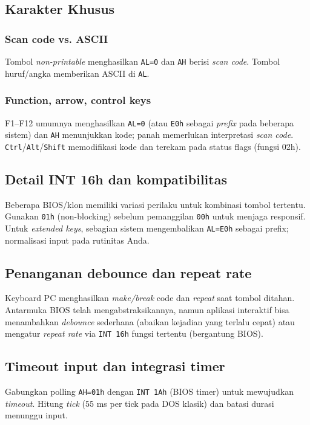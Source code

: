\subsection{Karakter Khusus}
\subsubsection{Scan code vs. ASCII}
Tombol \textit{non-printable} menghasilkan \texttt{AL=0} dan \texttt{AH} berisi \textit{scan code}. Tombol huruf/angka memberikan ASCII di \texttt{AL}.

\subsubsection{Function, arrow, control keys}
F1--F12 umumnya menghasilkan \texttt{AL=0} (atau \texttt{E0h} sebagai \textit{prefix} pada beberapa sistem) dan \texttt{AH} menunjukkan kode; panah memerlukan interpretasi \textit{scan code}. \texttt{Ctrl}/\texttt{Alt}/\texttt{Shift} memodifikasi kode dan terekam pada status flags (fungsi 02h).

\subsection{Detail INT 16h dan kompatibilitas}
Beberapa BIOS/klon memiliki variasi perilaku untuk kombinasi tombol tertentu. Gunakan \texttt{01h} (non-blocking) sebelum pemanggilan \texttt{00h} untuk menjaga responsif. Untuk \textit{extended keys}, sebagian sistem mengembalikan \texttt{AL=E0h} sebagai prefix; normalisasi input pada rutinitas Anda. \cite{rbil}

\subsection{Penanganan debounce dan repeat rate}
Keyboard PC menghasilkan \textit{make/break} code dan \textit{repeat} saat tombol ditahan. Antarmuka BIOS telah mengabstraksikannya, namun aplikasi interaktif bisa menambahkan \textit{debounce} sederhana (abaikan kejadian yang terlalu cepat) atau mengatur \textit{repeat rate} via \texttt{INT 16h} fungsi tertentu (bergantung BIOS). \cite{osdev_wiki}

\subsection{Timeout input dan integrasi timer}
Gabungkan polling \texttt{AH=01h} dengan \texttt{INT 1Ah} (BIOS timer) untuk mewujudkan \textit{timeout}. Hitung \textit{tick} (55 ms per tick pada DOS klasik) dan batasi durasi menunggu input. \cite{rbil}

